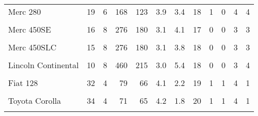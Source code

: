 \documentclass{article}
\begin{document}
\begin{table}
\begin{tabular}{lrrrrrrrrrrr}
Merc 280 & 19 & 6 & 168 & 123 & 3.9 & 3.4 & 18 & 1 & 0 & 4 & 4\\
\addlinespace
\cellcolor{blue!10}{Merc 280C} & \cellcolor{blue!10}{18} & \cellcolor{blue!10}{6} & \cellcolor{blue!10}{168} & \cellcolor{blue!10}{123} & \cellcolor{blue!10}{3.9} & \cellcolor{blue!10}{3.4} & \cellcolor{blue!10}{19} & \cellcolor{blue!10}{1} & \cellcolor{blue!10}{0} & \cellcolor{blue!10}{4} & \cellcolor{blue!10}{4}\\
Merc 450SE & 16 & 8 & 276 & 180 & 3.1 & 4.1 & 17 & 0 & 0 & 3 & 3\\
\cellcolor{blue!10}{Merc 450SL} & \cellcolor{blue!10}{17} & \cellcolor{blue!10}{8} & \cellcolor{blue!10}{276} & \cellcolor{blue!10}{180} & \cellcolor{blue!10}{3.1} & \cellcolor{blue!10}{3.7} & \cellcolor{blue!10}{18} & \cellcolor{blue!10}{0} & \cellcolor{blue!10}{0} & \cellcolor{blue!10}{3} & \cellcolor{blue!10}{3}\\
Merc 450SLC & 15 & 8 & 276 & 180 & 3.1 & 3.8 & 18 & 0 & 0 & 3 & 3\\
\cellcolor{blue!10}{Cadillac Fleetwood} & \cellcolor{blue!10}{10} & \cellcolor{blue!10}{8} & \cellcolor{blue!10}{472} & \cellcolor{blue!10}{205} & \cellcolor{blue!10}{2.9} & \cellcolor{blue!10}{5.2} & \cellcolor{blue!10}{18} & \cellcolor{blue!10}{0} & \cellcolor{blue!10}{0} & \cellcolor{blue!10}{3} & \cellcolor{blue!10}{4}\\
\addlinespace
Lincoln Continental & 10 & 8 & 460 & 215 & 3.0 & 5.4 & 18 & 0 & 0 & 3 & 4\\
\cellcolor{blue!10}{Chrysler Imperial} & \cellcolor{blue!10}{15} & \cellcolor{blue!10}{8} & \cellcolor{blue!10}{440} & \cellcolor{blue!10}{230} & \cellcolor{blue!10}{3.2} & \cellcolor{blue!10}{5.3} & \cellcolor{blue!10}{17} & \cellcolor{blue!10}{0} & \cellcolor{blue!10}{0} & \cellcolor{blue!10}{3} & \cellcolor{blue!10}{4}\\
Fiat 128 & 32 & 4 & 79 & 66 & 4.1 & 2.2 & 19 & 1 & 1 & 4 & 1\\
\cellcolor{blue!10}{Honda Civic} & \cellcolor{blue!10}{30} & \cellcolor{blue!10}{4} & \cellcolor{blue!10}{76} & \cellcolor{blue!10}{52} & \cellcolor{blue!10}{4.9} & \cellcolor{blue!10}{1.6} & \cellcolor{blue!10}{19} & \cellcolor{blue!10}{1} & \cellcolor{blue!10}{1} & \cellcolor{blue!10}{4} & \cellcolor{blue!10}{2}\\
Toyota Corolla & 34 & 4 & 71 & 65 & 4.2 & 1.8 & 20 & 1 & 1 & 4 & 1\\
\addlinespace
\cellcolor{blue!10}{Toyota Corona} & \cellcolor{blue!10}{22} & \cellcolor{blue!10}{4} & \cellcolor{blue!10}{120} & \cellcolor{blue!10}{97} & \cellcolor{blue!10}{3.7} & \cellcolor{blue!10}{2.5} & \cellcolor{blue!10}{20} & \cellcolor{blue!10}{1} & \cellcolor{blue!10}{0} & \cellcolor{blue!10}{3} & \cellcolor{blue!10}{1}\\

\end{tabular}
\end{table}
\end{document}
